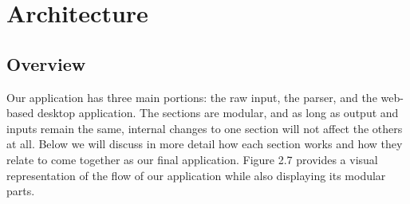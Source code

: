 \documentclass{hmcclinic}
\begin{document}
    
    
\section{Architecture} %

  \subsection{Overview}

  Our application has three main portions: the raw input, the parser,
  and the web-based desktop application. The sections are modular, and
  as long as output and inputs remain the same, internal changes to one section will
  not affect the others at all. Below we will discuss in more detail how each
  section works and how they relate to come together as our final application.
  Figure 2.7 provides a visual representation of the flow of our application
  while also displaying its modular parts.
  
\end{document}

